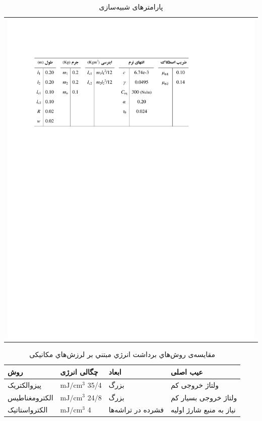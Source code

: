 \begin{table}[!htb]
\caption{پارامترهای شبیه‌سازی}
\centering
\begin{tabular}{c}
\includegraphics[scale=0.9]{Figures/SampleTable1.pdf} 
\end{tabular}
\vspace{-\baselineskip}
\label{Tbl:SampleTable1_2}
\end{table}

\begin{table}[!htb]
\caption{مقايسه‌ی روش‌هاي برداشت انرژي مبتني بر لرزش‌هاي مکانيکی}
\centering
\begin{tabular}{@{}|p{}|p{}|p{}|p{}|@{}}
\hline
روش
& 
چگالی انرژی
& 
ابعاد
& 
عیب اصلی
\\ \hline \hline
پیزوالکتریک
& 
$\mathrm{mJ/cm^3}$ 35/4
& 
بزرگ
& 
ولتاژ خروجی کم
\\ \hline
الکترومغناطیس
& 
$\mathrm{mJ/cm^3}$ 24/8
& 
بزرگ
& 
ولتاژ خروجی بسیار کم
\\ \hline
الکترواستاتیک
& 
$\mathrm{mJ/cm^3}$ 4
& 
فشرده در تراشه‌ها
& 
نیاز به منبع شارژ اولیه
\\ \hline
\end{tabular}
\label{Tbl:SampleTable2_2}
\vspace{-\baselineskip}
\end{table}

